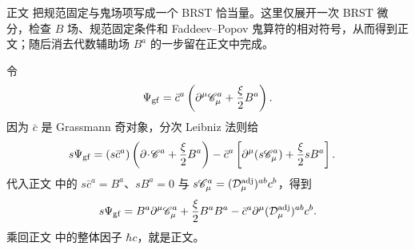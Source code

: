 \begin{derivation}

正文 把规范固定与鬼场项写成一个 BRST 恰当量。这里仅展开一次 BRST 微分，检查 $B$ 场、规范固定条件和 Faddeev--Popov 鬼算符的相对符号，从而得到正文；随后消去代数辅助场 $B^a$ 的一步留在正文中完成。

令
\begin{equation*}
 \Psi_{\rm gf}
 =\bar c^a\left(\partial^\mu\mathscr C_\mu^a+\frac\xi2B^a\right).
\end{equation*}
因为 $\bar c$ 是 Grassmann 奇对象，分次 Leibniz 法则给
\begin{align*}
 s\Psi_{\rm gf}
 ={}&(s\bar c^a)
 \left(\partial\!\cdot\!\mathscr C^a+\frac\xi2B^a\right)
 -\bar c^a\left[
 \partial^\mu(s\mathscr C_\mu^a)+\frac\xi2sB^a
 \right].
\end{align*}
代入正文 中的
$s\bar c^a=B^a$、$sB^a=0$ 与
$s\mathscr C_\mu^a=(\mathcal D_\mu^{\rm adj})^{ab}c^b$，得到
\begin{equation*}
 s\Psi_{\rm gf}
 =B^a\partial^\mu\mathscr C_\mu^a
 +\frac\xi2B^aB^a
 -\bar c^a\partial^\mu(\mathcal D_\mu^{\rm adj})^{ab}c^b.
\end{equation*}
乘回正文 中的整体因子 $\hbar c$，就是正文。
\end{derivation}
